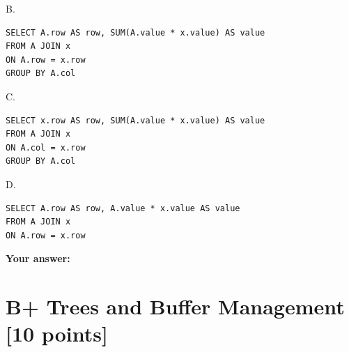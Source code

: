 \documentclass[10pt]{article}
\begin{document}
\begin{enumerate}
	      B.
	      \begin{lstlisting}
SELECT A.row AS row, SUM(A.value * x.value) AS value 
FROM A JOIN x
ON A.row = x.row
GROUP BY A.col
\end{lstlisting}
	      C.
	      \begin{lstlisting} 
SELECT x.row AS row, SUM(A.value * x.value) AS value 
FROM A JOIN x
ON A.col = x.row
GROUP BY A.col
\end{lstlisting}
	      D.
	      \begin{lstlisting}
SELECT A.row AS row, A.value * x.value AS value 
FROM A JOIN x
ON A.row = x.row  
\end{lstlisting}

\end{enumerate}
\textbf{Your answer:}




\newpage
\section{B+ Trees and Buffer Management \textbf{[10 points]}}
\end{document}
